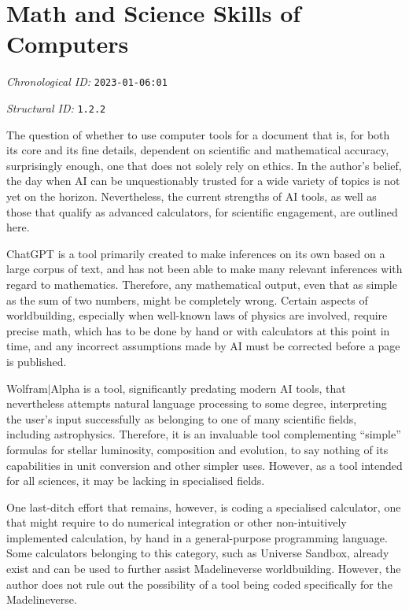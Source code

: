 \section{Math and Science Skills of Computers}
\emph{Chronological ID:} \texttt{2023-01-06:01}

\emph{Structural ID:} \texttt{1.2.2}

The question of whether to use computer tools for a document that is, for both its core and its fine details, dependent on scientific and mathematical accuracy, surprisingly enough, one that does not solely rely on ethics. In the author's belief, the day when AI can be unquestionably trusted for a wide variety of topics is not yet on the horizon. Nevertheless, the current strengths of AI tools, as well as those that qualify as advanced calculators, for scientific engagement, are outlined here.

ChatGPT is a tool primarily created to make inferences on its own based on a large corpus of text, and has not been able to make many relevant inferences with regard to mathematics. Therefore, any mathematical output, even that as simple as the sum of two numbers, might be completely wrong. Certain aspects of worldbuilding, especially when well-known laws of physics are involved, require precise math, which has to be done by hand or with calculators at this point in time, and any incorrect assumptions made by AI must be corrected before a page is published.

Wolfram$\vert$Alpha is a tool, significantly predating modern AI tools, that nevertheless attempts natural language processing to some degree, interpreting the user's input successfully as belonging to one of many scientific fields, including astrophysics. Therefore, it is an invaluable tool complementing ``simple'' formulas for stellar luminosity, composition and evolution, to say nothing of its capabilities in unit conversion and other simpler uses. However, as a tool intended for all sciences, it may be lacking in specialised fields.

One last-ditch effort that remains, however, is coding a specialised calculator, one that might require to do numerical integration or other non-intuitively implemented calculation, by hand in a general-purpose programming language. Some calculators belonging to this category, such as Universe Sandbox, already exist and can be used to further assist Madelineverse worldbuilding. However, the author does not rule out the possibility of a tool being coded specifically for the Madelineverse.
\newpage
